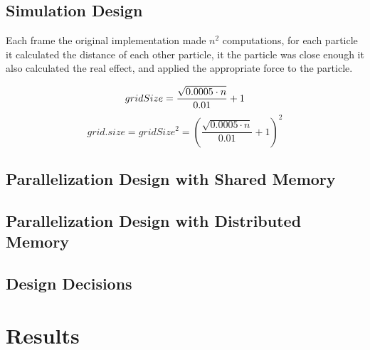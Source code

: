 \documentclass[titlepage,a4paper,10pt]{article}
\begin{document}
    \subsection{Simulation Design}

        Each frame the original implementation made $n^2$ computations, for each
        particle it calculated the distance of each other particle, it the
        particle was close enough it also calculated the real effect, and
        applied the appropriate force to the particle. 

        \begin{equation}
            gridSize = \frac{\sqrt{0.0005 \cdot n}}{0.01} + 1 \\
        \end{equation}
        \begin{equation}
            grid.size = gridSize^2 = \left(\frac{\sqrt{0.0005 \cdot n}}{0.01} + 1\right)^2
        \end{equation}

    \subsection{Parallelization Design with Shared Memory}%

    \subsection{Parallelization Design with Distributed Memory}%

    \subsection{Design Decisions}%

\section{Results}

\end{document}
